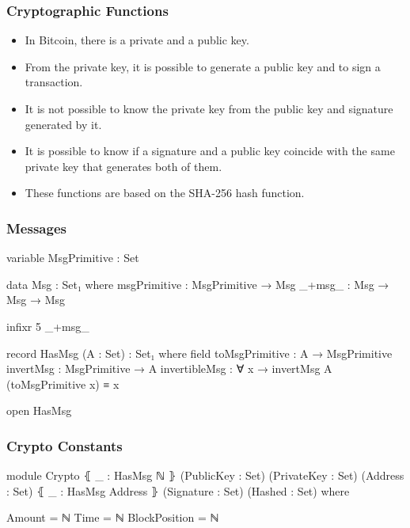 \documentclass{beamer}
\begin{document}
\begin{frame}
  \frametitle{Cryptographic Functions}
  \begin{itemize}
    \item In Bitcoin, there is a private and a public key.
    \item From the private key, it is possible to generate a public key
 and to sign a transaction.
    \item It is not possible to know the private key from the public key and signature generated by it.
    \item It is possible to know if a signature and a public key coincide with the same private key that generates both of them.
    \item These functions are based on the SHA-256 hash function.
  \end{itemize}
\end{frame}

\begin{frame}
  \frametitle{Messages}
\begin{code}

variable
  MsgPrimitive : Set

data Msg : Set₁ where
  msgPrimitive : MsgPrimitive → Msg
  _+msg_ : Msg → Msg → Msg

infixr 5 _+msg_

record HasMsg (A : Set) : Set₁ where
  field
    toMsgPrimitive : A → MsgPrimitive
    invertMsg      : MsgPrimitive → A
    invertibleMsg  : ∀ x → invertMsg {A} (toMsgPrimitive x) ≡ x

open HasMsg
\end{code}


\end{frame}

\begin{frame}
  \frametitle{Crypto Constants}
\begin{code}

module Crypto
  ⦃ _ : HasMsg ℕ ⦄
  (PublicKey : Set)
  (PrivateKey : Set)
  (Address : Set)
  ⦃ _ : HasMsg Address ⦄
  (Signature : Set)
  (Hashed : Set)
  where

  Amount = ℕ
  Time = ℕ
  BlockPosition = ℕ
\end{code}
\end{frame}
\end{document}
